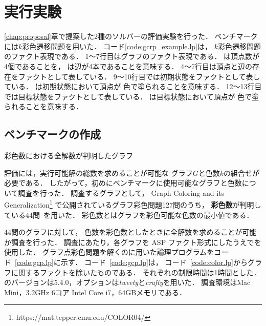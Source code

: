 \section{実行実験} \label{chap:experiment}
\ref{chap:proposal}章で提案した2種のソルバーの評価実験を行った．
ベンチマークには$k$彩色遷移問題を用いた．
コード\ref{code:gcrp_example.lp}は，
$k$彩色遷移問題のファクト表現である．
1～7行目はグラフのファクト表現である．
は頂点数が4個であることを，
は辺が4本であることを意味する．
4～7行目は頂点と辺の存在をファクトとして表している．
9～10行目では初期状態をファクトとして表している．
は初期状態において頂点が
色で塗られることを意味する．
12～13行目では目標状態をファクトとして表している．
は目標状態において頂点が
色で塗られることを意味する．



\subsection{ベンチマークの作成}
\begin{table*}[t]
  \centering
  \caption{彩色数における全解数が判明したグラフ}
  \label{tab:bench_graph}
  
\end{table*}

評価には，実行可能解の総数を求めることが可能な
グラフ$G$と色数$k$の組合せが必要である．
したがって，初めにベンチマークに使用可能なグラフと色数について調査を行った．
調査するグラフとして，
Graph Coloring and its Generalization\footnote{https://mat.tepper.cmu.edu/COLOR04/}
で公開されているグラフ彩色問題127問のうち，
\textbf{彩色数}が判明している44問~\cite{DBLP:journals/constraints/TamuraTKB09}を用いた．
彩色数とはグラフを彩色可能な色数の最小値である．

44問のグラフに対して，
色数を彩色数としたときに全解数を求めることが可能か調査を行った．
調査にあたり，各グラフを ASP ファクト形式にしたうえで{\clingo}を使用した．
グラフ点彩色問題を解くのに用いた論理プログラムをコード~\ref{code:gcp.lp}に示す．
コード~\ref{code:gcp.lp}は，
コード~\ref{code:color.lp}からグラフに関するファクトを除いたものである．
それぞれの制限時間は1時間とした．
{\clingo}のバージョンは5.4.0，オプションは\textsl{tweety}と\textsl{crafty}を用いた．
調査環境はMac Mini，3.2GHz 6コア Intel Core i7，64GBメモリである．

